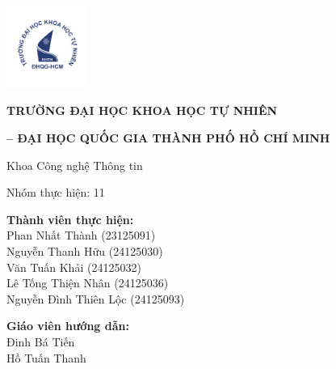 \centering
\begin{center}
\includegraphics[width=0.2\textwidth]{img/hcmus-logo.png}
\end{center}

{\Large\bfseries TRƯỜNG ĐẠI HỌC KHOA HỌC TỰ NHIÊN \par}
{\Large\bfseries – ĐẠI HỌC QUỐC GIA THÀNH PHỐ HỒ CHÍ MINH \par}

\vspace{0.2cm}
{\large Khoa Công nghệ Thông tin \par}
\vspace{0.8cm}

{\Large\bfseries \coursename \par}
\vspace{1cm}
{\huge\bfseries \reporttitle \par}
\vspace{1.2cm}

{\Large Nhóm thực hiện: 11 \par}
\vspace{0.3cm}
\textbf{Thành viên thực hiện:} \\

Phan Nhất Thành (23125091)\\
Nguyễn Thanh Hữu (24125030)\\
Văn Tuấn Khải (24125032)\\
Lê Tống Thiện Nhân (24125036)\\
Nguyễn Đình Thiên Lộc (24125093) \\
\vspace{0.8cm}

\textbf{Giáo viên hướng dẫn: } \\
Đinh Bá Tiến\\
Hồ Tuấn Thanh\\

\vfill



